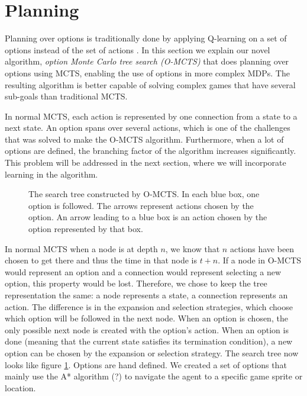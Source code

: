 \section{Planning}
\label{sec:planning}


Planning over options is traditionally done by applying Q-learning on a set of
options instead of the set of actions \cite{sutton1999between}. In this section
we explain our novel algorithm, \emph{option Monte Carlo tree search (O-MCTS)}
that does planning over options using MCTS, enabling the use of options in more
complex MDPs. The resulting algorithm is better capable of solving complex games
that have several sub-goals than traditional MCTS.

In normal MCTS, each action is represented by one connection from a state to a
next state. An option spans over several actions, which is one of the challenges
that was solved to make the O-MCTS algorithm. Furthermore, when a lot
of options are defined, the branching factor of the algorithm increases
significantly. This problem will be addressed in the next section, where we will
incorporate learning in the algorithm.

\begin{figure}
	\centering
	\caption{The search tree constructed by O-MCTS. In each blue box, one option
	is followed. The arrows represent actions chosen by the option. An arrow
leading to a blue box is an action chosen by the option represented by that box.}
	\label{fig:omcts-tree}
\end{figure}

In normal MCTS when a node is at depth $n$, we know that $n$ actions have been
chosen to get there and thus the time in that node is $t+n$. 
If a node in O-MCTS would represent an option and a connection would represent
selecting a new option, this property would be lost. Therefore, we chose to keep
the tree representation the same: a node represents a state, a connection
represents an action. The difference is in the expansion and selection
strategies, which choose which option will be followed in the next node. When an
option is chosen, the only possible next node is created with the option's
action. When an option is done (meaning that the current state satisfies its
termination condition), a new option can be chosen by the expansion or selection
strategy. The search tree now looks like figure \ref{fig:omcts-tree}.
Options are hand defined. We created a set of options that mainly use the A*
algorithm (\cn?) to navigate the agent to a specific game sprite or location.

